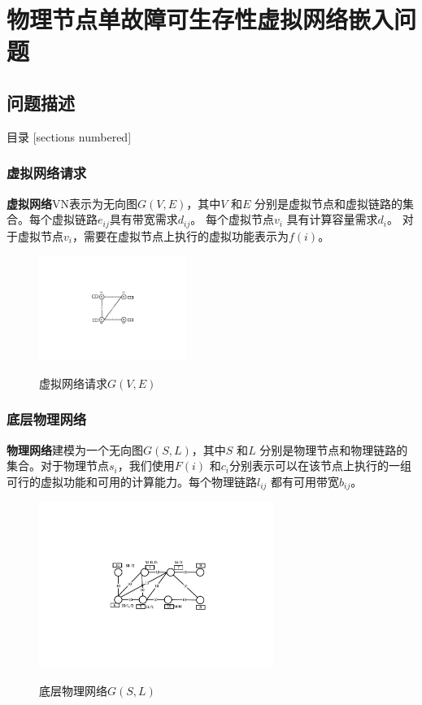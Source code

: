 \section{物理节点单故障可生存性虚拟网络嵌入问题}
\subsection{问题描述}

\begin{frame}{目录}
    [sections numbered]
\end{frame}
\addtocounter{framenumber}{-1}  %

\begin{frame}
\frametitle{虚拟网络请求}
\textbf{虚拟网络}VN表示为无向图$G (V,E)$，其中$V$ 和$E$ 分别是虚拟节点和虚拟链路的集合。每个虚拟链路$e_{ij}$具有带宽需求$d_{ij}$。 每个虚拟节点$v_i$ 具有计算容量需求$d_i$。 对于虚拟节点$v_i$，需要在虚拟节点上执行的虚拟功能表示为$f(i)$。
\begin{figure}[htbp]
\centering
\includegraphics[width=1.9in]{figures/VirtualNetworkRequest}\\
\caption{虚拟网络请求$G(V,E)$
}\label{fig:VirtualNetworkRequest}
\end{figure}
\end{frame}

\begin{frame}
\frametitle{底层物理网络}
\textbf{物理网络}建模为一个无向图$G (S,L)$，其中$S$ 和$L$ 分别是物理节点和物理链路的集合。对于物理节点$s_i$，我们使用$F(i)$ 和$c_i$分别表示可以在该节点上执行的一组可行的虚拟功能和可用的计算能力。每个物理链路$l_{ij}$ 都有可用带宽$b_{ij}$。
\begin{figure}[htbp]
\centering
\includegraphics[width=3.0in]{figures/PhysicalNetwork}\\
\caption{底层物理网络$G(S,L)$}\label{fig:PhysicalNetwork}
\end{figure}
\end{frame}



